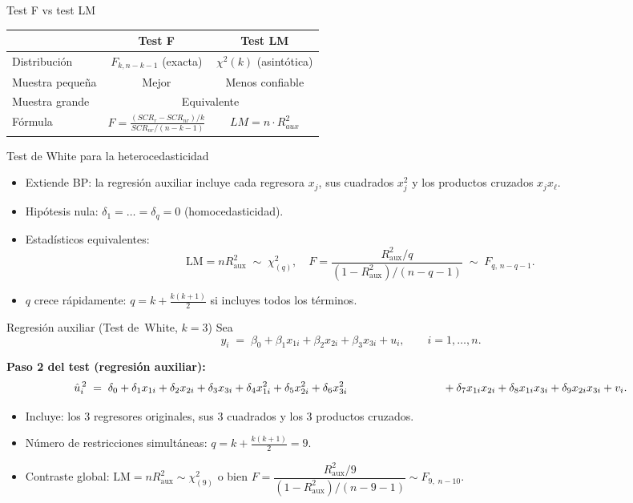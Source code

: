 \documentclass{beamer}
\begin{document}
\begin{frame}{Test F vs test LM}
    
\begin{table}[h]
\centering
\begin{tabular}{lcc}
\toprule
& \textbf{Test F} & \textbf{Test LM} \\
\midrule
Distribución & $F_{k, n-k-1}$ (exacta) & $\chi^2(k)$ (asintótica) \\
Muestra pequeña & Mejor & Menos confiable \\
 Muestra grande & \multicolumn{2}{c}{Equivalente} \\
Fórmula & $F = \frac{(SCR_r - SCR_{nr})/k}{SCR_{nr}/(n-k-1)}$ & $LM = n \cdot R^2_{aux}$ \\
\bottomrule
\end{tabular}
\end{table}
\end{frame}

\begin{frame}{Test de White para la heterocedasticidad}
\begin{itemize}
  \item Extiende BP: la regresión auxiliar incluye cada regresora $x_j$, sus cuadrados $x_j^{2}$ y los productos cruzados $x_jx_{\ell}$.
  \item Hipótesis nula: $\delta_1=\dots=\delta_q=0$ (homocedasticidad).
  \item Estadísticos equivalentes:
  \[
    \text{LM}=nR_{\text{aux}}^{2}\;\sim\;\chi^{2}_{(q)},\quad
    F=\frac{R_{\text{aux}}^{2}/q}{(1-R_{\text{aux}}^{2})/(n-q-1)}\;\sim\;F_{q,\,n-q-1}.
  \]
  \item $q$ crece rápidamente: $q=k+\tfrac{k(k+1)}{2}$ si incluyes todos los términos.
\end{itemize}
\end{frame}

\begin{frame}{Regresión auxiliar (Test de White, $k=3$)}
Sea
\[
y_i \;=\;\beta_0+\beta_1x_{1i}+\beta_2x_{2i}+\beta_3x_{3i}+u_i ,
\qquad i=1,\dots,n .
\]

\medskip
\textbf{Paso 2 del test (regresión auxiliar):}
\[
\hat{u}_i^{\,2}\;=\; 
\delta_0
+\delta_1 x_{1i}+\delta_2 x_{2i}+\delta_3 x_{3i}
+\delta_4 x_{1i}^{2}+\delta_5 x_{2i}^{2}+\delta_6 x_{3i}^{2} \\ \hspace{3cm}
+\delta_7 x_{1i}x_{2i}+\delta_8 x_{1i}x_{3i}+\delta_9 x_{2i}x_{3i}
+ v_i .
\]

\begin{itemize}
  \item Incluye: los 3 regresores originales, sus 3 cuadrados y los 3 productos cruzados.
  \item Número de restricciones simultáneas: \(q =k+ \tfrac{k(k+1)}{2} = 9\).
  \item Contraste global: \(\text{LM}=nR_{\text{aux}}^{2}\sim\chi^{2}_{(9)}\)  
        o bien  
        \(F=\dfrac{R_{\text{aux}}^{2}/9}{(1-R_{\text{aux}}^{2})/(n-9-1)}
          \sim F_{9,\;n-10}\).
\end{itemize}
\end{frame}
\end{document}
